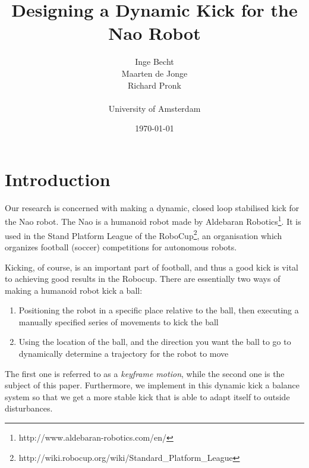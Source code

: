 \documentclass[a4paper]{article}
\begin{document}
\newcommand{\bvect}[1] {\begin{bmatrix} #1 \end{bmatrix}}
\newcommand{\pvect}[1] {\begin{pmatrix} #1 \end{pmatrix}}

\title{Designing a Dynamic Kick for the Nao Robot}
\author{ Inge Becht \\ 
         Maarten de Jonge \\ 
         Richard Pronk \\\\
         \large{University of Amsterdam}}
\date{\today}
\maketitle

\newenvironment{changemargin}[2]{%
\begin{list}{}{%
\setlength{\topsep}{0pt}%
\setlength{\leftmargin}{#1}%
\setlength{\rightmargin}{#2}%
\setlength{\listparindent}{\parindent}%
\setlength{\itemindent}{\parindent}%
\setlength{\parsep}{\parskip}%
}%
\item[]}{\end{list}}

\section{Introduction} 
Our research is concerned with making a dynamic, closed
loop stabilised kick for the Nao robot. The Nao is a humanoid robot made by
Aldebaran Robotics\footnote{http://www.aldebaran-robotics.com/en/}. It is used in
the Stand Platform League of the
RoboCup\footnote{http://wiki.robocup.org/wiki/Standard\_Platform\_League}, an organisation which organizes football (soccer)
competitions for autonomous robots.

Kicking, of course, is an important part of football, and thus a good kick is vital to achieving good results in the Robocup. There are essentially two ways of making a humanoid robot kick a ball:
\begin{enumerate}
  \item Positioning the robot in a specific place relative to the ball, then
      executing a manually specified series of movements to kick the ball
  \item Using the location of the ball, and the direction you want the ball to
      go to dynamically determine a trajectory for the robot to move
\end{enumerate}
The first one is referred to as a \emph{keyframe motion}, while the second one
is the subject of this paper. Furthermore, we implement in this dynamic kick a
balance system so that we get a more stable kick that is able to adapt itself to
outside disturbances.
\end{document}
